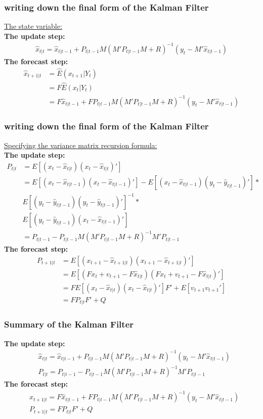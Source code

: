 \documentclass[notes=show]{beamer}%
\begin{document}
\begin{frame}
\frametitle{writing down the final form of the Kalman Filter}
\underline{The state variable:} \\
\bigskip
\textbf{The update step:} 
\begin{align}
\hat{x}_{t|t}=\hat{x}_{t|t-1}+P_{t|t-1}M(M'P_{t|t-1}M+R)^{-1}(y_{t}-M'\hat{x}_{t|t-1})
\end{align}
\textbf{The forecast step:} 
\begin{align}
\hat{x}_{t+1|t}&=\hat{E}(x_{t+1}|Y_{t})\nonumber\\
&=F\hat{E}(x_{t}|Y_{t})\nonumber\\
&=F\hat{x}_{t|t-1}+FP_{t|t-1}M(M'P_{t|t-1}M+R)^{-1}(y_{t}-M'\hat{x}_{t|t-1})
\end{align}

\end{frame}

\begin{frame}
\frametitle{writing down the final form of the Kalman Filter}
\underline{Specifying the variance matrix recursion formula:} \\
\bigskip
\textbf{The update step:} 
\begin{align}
P_{t|t}&=E[(x_{t}-\hat{x}_{t|t})(x_{t}-\hat{x}_{t|t})']\nonumber\\
&=E[(x_{t}-\hat{x}_{t|t-1})(x_{t}-\hat{x}_{t|t-1})'] - E[(x_{t}-\hat{x}_{t|t-1})(y_{t}-\hat{y}_{t|t-1})']*\nonumber\\
&E[(y_{t}-\hat{y}_{t|t-1})(y_{t}-\hat{y}_{t|t-1})']^{-1}*\nonumber\\
&E[(y_{t}-\hat{y}_{t|t-1})(x_{t}-\hat{x}_{t|t-1})']\nonumber\\
&=P_{t|t-1}-P_{t|t-1}M(M'P_{t|t-1}M+R)^{-1}M'P_{t|t-1}
\end{align}
\textbf{The forecast step:} 
\begin{align}
P_{t+1|t}&=E[(x_{t+1}-\hat{x}_{t+1|t})(x_{t+1}-\hat{x}_{t+1|t})']\nonumber\\
&=E[(F x_{t}+v_{t+1}- F\hat{x}_{t|t})(F x_{t}+v_{t+1}-F\hat{x}_{t|t})']\nonumber\\
&=F E[(x_{t}-\hat{x}_{t|t})(x_{t}-\hat{x}_{t|t})']F'+E[v_{t+1}v_{t+1}']\nonumber\\
&=FP_{t|t}F'+Q
\end{align}

\end{frame}


\begin{frame}
\frametitle{Summary of the Kalman Filter}
\textbf{The update step:} 
\begin{align}
&\hat{x}_{t|t}=\hat{x}_{t|t-1}+P_{t|t-1}M(M'P_{t|t-1}M+R)^{-1}(y_{t}-M'\hat{x}_{t|t-1})\\
&P_{t|t}=P_{t|t-1}-P_{t|t-1}M(M'P_{t|t-1}M+R)^{-1}M'P_{t|t-1}
\end{align}
\textbf{The forecast step:} 
\begin{align}
&\hat{x}_{t+1|t}=F\hat{x}_{t|t-1}+FP_{t|t-1}M(M'P_{t|t-1}M+R)^{-1}(y_{t}-M'\hat{x}_{t|t-1})\\
&P_{t+1|t}=FP_{t|t}F'+Q
\end{align}

\end{frame}
\end{document}
